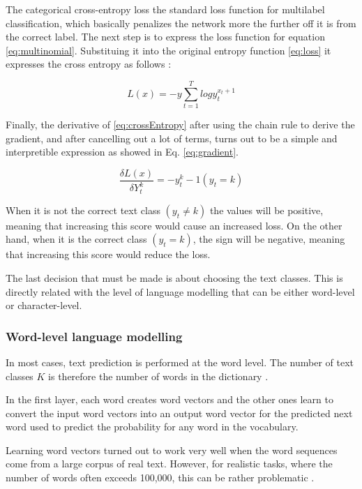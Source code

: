 The categorical cross-entropy loss the standard loss function for multilabel classification, which basically penalizes the network more the further off it is from the correct label. The next step is to express the loss function for equation \ref{eq:multinomial}. Substituing it into the original entropy function \ref{eq:loss} it expresses the cross entropy as follows \cite{graves2013generating}:

\begin{equation} \label{eq:crossEntropy}
L(x)=-y \sum_{t=1}^{T} log y^{x_t+1}_t
\end{equation}

Finally, the derivative of \ref{eq:crossEntropy} after using the chain rule to derive the gradient, and after cancelling out a lot of terms, turns out to be a simple and interpretible expression as showed in Eq. \ref{eq:gradient}.

\begin{equation} \label{eq:cgradient}
\frac{\delta L(x)}{\delta Y^k_t}=- y^k_t - 1 (y_t=k)
\end{equation}

When it is not the correct text class $(y_t \not= k)$ the values will be positive, meaning that increasing this score would cause an increased loss. On the other hand, when it is the correct class $(y_t = k)$, the sign will be negative, meaning that increasing this score would reduce the loss.


The last decision that must be made is about choosing the text classes. This is directly related with the level of language modelling that can be either word-level or character-level.

\subsubsection{Word-level language modelling}

In most cases, text prediction is performed at the word level. The number of text classes $K$ is therefore the number of words in the dictionary \cite{graves2013generating}.

In the first layer, each word creates word vectors and the other ones learn to convert the input word vectors into an output word vector for the predicted next word used to predict the probability for any word in the vocabulary. 

Learning word vectors turned out to work very well when the word sequences come from a large corpus of real text. However, for realistic tasks, where the number of words often exceeds 100,000, this can be rather problematic \cite{lecun2015deep}. 

